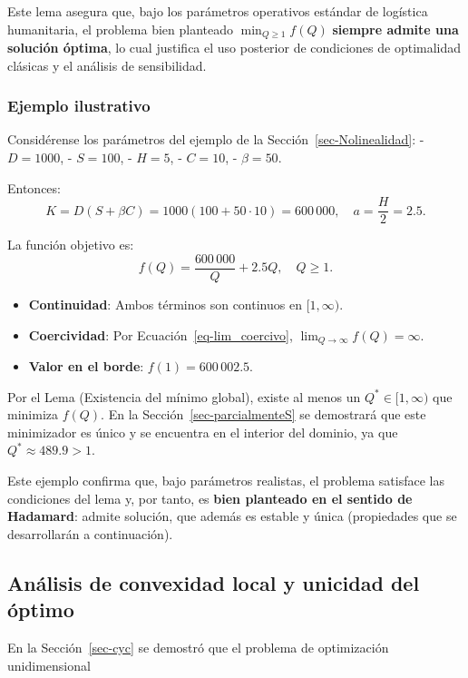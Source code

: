 \documentclass[
  spanish,
  us-letterpaper,
]{scrreprt}
\providecommand{\tightlist}{%
  \setlength{\itemsep}{0pt}\setlength{\parskip}{0pt}}
\numberwithin{equation}{section}
\begin{document}
Este lema asegura que, bajo los parámetros operativos estándar de
logística humanitaria, el problema bien planteado
\(\min_{Q \geq 1} f(Q)\) \textbf{siempre admite una solución óptima}, lo
cual justifica el uso posterior de condiciones de optimalidad clásicas y
el análisis de sensibilidad.

\subsubsection{Ejemplo ilustrativo}\label{ejemplo-ilustrativo-1}

Considérense los parámetros del ejemplo de la
Sección~\ref{sec-Nolinealidad}: - \(D = 1000\), - \(S = 100\), -
\(H = 5\), - \(C = 10\), - \(\beta = 50\).

Entonces: \[
K = D(S + \beta C) = 1000(100 + 50 \cdot 10) = 600\,000, \quad
a = \frac{H}{2} = 2.5.
\]

La función objetivo es: \[
f(Q) = \frac{600\,000}{Q} + 2.5 Q, \quad Q \geq 1.
\]

\begin{itemize}
\tightlist
\item
  \textbf{Continuidad}: Ambos términos son continuos en
  \([1, \infty)\).\\
\item
  \textbf{Coercividad}: Por Ecuación~\ref{eq-lim_coercivo},
  \(\lim_{Q \to \infty} f(Q) = \infty\).\\
\item
  \textbf{Valor en el borde}: \(f(1) = 600\,002.5\).
\end{itemize}

Por el Lema (Existencia del mínimo global), existe al menos un
\(Q^* \in [1, \infty)\) que minimiza \(f(Q)\). En la
Sección~\ref{sec-parcialmenteS} se demostrará que este minimizador es
único y se encuentra en el interior del dominio, ya que
\(Q^* \approx 489.9 > 1\).

Este ejemplo confirma que, bajo parámetros realistas, el problema
satisface las condiciones del lema y, por tanto, es \textbf{bien
planteado en el sentido de Hadamard}: admite solución, que además es
estable y única (propiedades que se desarrollarán a continuación).

\subsection{Análisis de convexidad local y unicidad del
óptimo}\label{sec-analisis}

En la Sección~\ref{sec-cyc} se demostró que el problema de optimización
unidimensional
\end{document}
